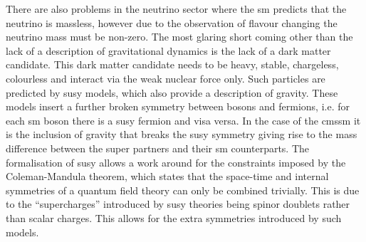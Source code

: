 There are also problems in the neutrino sector where the \ac{sm} predicts that 
the neutrino is massless, however due to the observation of flavour changing 
the neutrino mass must be non-zero.
The most glaring short coming other than the lack of a description of 
gravitational dynamics is the lack of a dark matter candidate. This dark matter 
candidate needs to be heavy, stable, chargeless, colourless and interact via 
the weak nuclear force only. Such particles are predicted by 
\ac{susy} 
models, which also provide a description of gravity. These models insert a 
further broken symmetry between bosons and fermions, i.e. for each \ac{sm} 
boson there is a \ac{susy} fermion and visa versa. In the case of the 
\ac{cmssm} it is the inclusion of gravity that breaks the \ac{susy} symmetry 
giving rise to the mass difference between the super partners and their \ac{sm} 
counterparts. 
The formalisation of \ac{susy} allows a work around for the constraints imposed 
by the Coleman-Mandula theorem, which states that the 
space-time and internal symmetries of a quantum field theory can only be 
combined trivially. This is due to the ``supercharges'' introduced by \ac{susy}
theories being spinor doublets rather than scalar charges. This allows for the 
extra symmetries introduced by such models.


